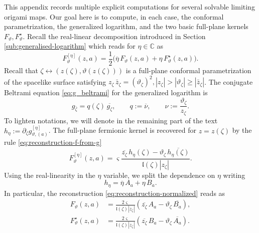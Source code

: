 \documentclass[reqno]{amsart}
\numberwithin{equation}{section}
\theoremstyle{definition}
\theoremstyle{remark}
\newcommand\C{\mathbb{C}}
\providecommand{\ellm}{\mathfrak l}
\begin{document}
This appendix records multiple explicit computations for several solvable limiting origami maps. Our goal here is to compute, in each case, the conformal parametrization, the generalized logarithm, and the two basic full-plane kernels $F_\vartheta,F^\star_\vartheta $. Recall the real-linear decomposition introduced in  Section \ref{sub:generalised-logarithm} which reads for $\eta\in\C$ as
\begin{equation}\label{eq:basic-decomposition}
        F^{[\eta]}_\vartheta(z,a)
        =\frac12\bigl(\overline\eta\,F_\vartheta(z,a)+\eta\,F^\star_\vartheta(z,a)\bigr).
\end{equation}
Recall that $\zeta\leftrightarrow (z(\zeta),\vartheta(z(\zeta)))$ is a full-plane conformal parametrization of the spacelike surface satisfying $ z_\zeta\,\bar z_\zeta=(\vartheta_\zeta)^2,|z_\zeta|>|\vartheta_\zeta|\geq |\bar z_\zeta|$. The conjugate Beltrami equation \eqref{eq:g_beltrami} for the generalized logarithm is
\begin{equation}\label{eq:conjugate-beltrami-local}
        g_{\bar\zeta}=q(\zeta)\,\overline{g_\zeta},
        \qquad
        q:=\overline\nu,
        \qquad
        \nu:=\frac{\vartheta_\zeta}{z_\zeta}.
\end{equation}
To lighten notations, we will denote in the remaining part of the text $h_\eta:=\partial_\zeta g^{[\eta]}_{\vartheta,(a)}$. The full-plane fermionic kernel is recovered for $z=z(\zeta)$ by the rule \eqref{eq:reconstruction-f-from-g}
\begin{equation}\label{eq:reconstruction-normalized}
        F^{[\eta]}_\vartheta(z,a)
        = \varsigma
        \frac{
        \overline{z_\zeta}\,h_\eta(\zeta)
        -\vartheta_\zeta\,\overline{h_\eta(\zeta)}
        }{\ellm(\zeta)|z_\zeta|}.
\end{equation}
Using the real-linearity in the $\eta$ variable, we split the dependence on $\eta$ writing
\begin{equation}\label{eq:h-decomposition}
        h_\eta=\overline\eta\,A_a+\eta\,B_a.
\end{equation}
In particular, the reconstruction \eqref{eq:reconstruction-normalized} reads as
\begin{equation}\label{eq:F-Fstar-from-A-B}
\begin{aligned}
        F_\vartheta(z,a)
        &=\frac{2\varsigma}{\ellm(\zeta) |z_\zeta|}
        \left(\overline{z_\zeta}\,A_a-\vartheta_\zeta\,\overline{B_a}\right),\\[1mm]
        F^\star_\vartheta(z,a)
        &=\frac{2\varsigma}{\ellm(\zeta) |z_\zeta|}
        \left(\overline{z_\zeta}\,B_a-\vartheta_\zeta\,\overline{A_a}\right).
\end{aligned}
\end{equation}
\end{document}
